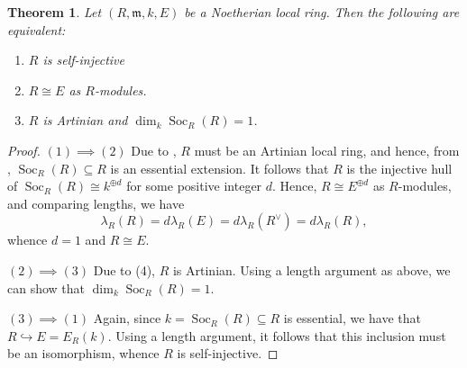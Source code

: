 \documentclass[10pt]{article}
\theoremstyle{thmstyle}
\newtheorem{theorem}{Theorem}[section]
\theoremstyle{defstyle}
\newcommand{\frakm}{\mathfrak{m}} %
\newcommand{\into}{\hookrightarrow}
\newcommand{\Soc}{\operatorname{Soc}}
\begin{document}
\begin{theorem}
    Let $(R,\frakm, k, E)$ be a Noetherian local ring. Then the following are equivalent: 
    \begin{enumerate}[label=(\arabic*)]
        \item $R$ is self-injective
        \item $R\cong E$ as $R$-modules. 
        \item $R$ is Artinian and $\dim_k\Soc_R(R) = 1$.
    \end{enumerate}
\end{theorem}
\begin{proof}
$(1)\implies(2)$ Due to , $R$ must be an Artinian local ring, and hence, from , $\Soc_R(R)\subseteq R$ is an essential extension. It follows that $R$ is the injective hull of $\Soc_R(R)\cong k^{\oplus d}$ for some positive integer $d$. Hence, $R\cong E^{\oplus d}$ as $R$-modules, and comparing lengths, we have 
\begin{equation*}
    \lambda_R(R) = d\lambda_R(E) = d\lambda_R(R^\vee) = d\lambda_R(R),
\end{equation*}
whence $d = 1$ and $R\cong E$. 

$(2)\implies(3)$ Due to  (4), $R$ is Artinian. Using a length argument as above, we can show that $\dim_k\Soc_R(R) = 1$. 

$(3)\implies(1)$ Again, since $k = \Soc_R(R)\subseteq R$ is essential, we have that $R\into E = E_R(k)$. Using a length argument, it follows that this inclusion must be an isomorphism, whence $R$ is self-injective.
\end{proof}
\end{document}
